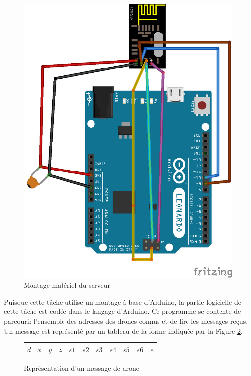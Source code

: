 \documentclass[a4paper,10pt]{report}
\begin{document}
	\begin{figure}[htbp]
	  \centering
	  \includegraphics[scale=0.8]{img/montage_serveur.png}
	  \caption{Montage matériel du serveur}
	  \label{montage_serveur}
	\end{figure}
	
      Puisque cette tâche utilise un montage à base d'Arduino, la partie 
logicielle de cette tâche est codée dans le langage d'Arduino. Ce programme se 
contente de parcourir l'ensemble des adresses des drones connus et de lire les 
messages reçus. Un message est représenté par un tableau de la forme indiquée 
par la Figure \ref{message_drone}.

	\begin{figure}
	  \begin{center}
	    \begin{tabular}{|c|c|c|c|c|c|c|c|c|c|c|}
	      \hline
	      $d$ & $x$ & $y$ & $z$ & $s1$ & $s2$ & $s3$ & $s4$ & $s5$ & $s6$ & 
$e$ \\
	      \hline
	    \end{tabular}
	  \end{center}
	  \caption{Représentation d'un message de drone}
	  \label{message_drone}
	\end{figure}
	
\end{document}
